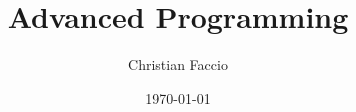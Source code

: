 \documentclass[a4paper,12pt]{report}
\institute{UniTs - University of Trieste}
\title{Advanced Programming}
\author{Christian Faccio}
\date{\today}
\begin{document}
\maketitle



\toc




\end{document}
